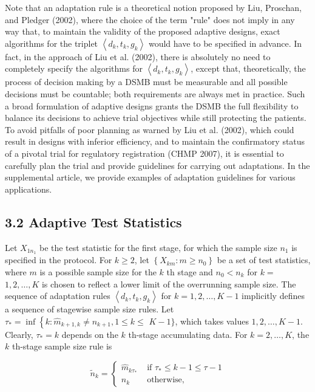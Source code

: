 \documentclass[10pt]{article}
\begin{document}
Note that an adaptation rule is a theoretical notion proposed by Liu, Proschan, and Pledger (2002), where the choice of the term "rule" does not imply in any way that, to maintain the validity of the proposed adaptive designs, exact algorithms for the triplet $\left\langle d_{k}, t_{k}, g_{k}\right\rangle$ would have to be specified in advance. In fact, in the approach of Liu et al. (2002), there is absolutely no need to completely specify the algorithms for $\left\langle d_{k}, t_{k}, g_{k}\right\rangle$, except that, theoretically, the process of decision making by a DSMB must be measurable and all possible decisions must be countable; both requirements are always met in practice. Such a broad formulation of adaptive designs grants the DSMB the full flexibility to balance its decisions to achieve trial objectives while still protecting the patients. To avoid pitfalls of poor planning as warned by Liu et al. (2002), which could result in designs with inferior efficiency, and to maintain the confirmatory status of a pivotal trial for regulatory registration (CHMP 2007), it is essential to carefully plan the trial and provide guidelines for carrying out adaptations. In the supplemental article, we provide examples of adaptation guidelines for various applications.

\subsection*{3.2 Adaptive Test Statistics}
Let $X_{1 n_{1}}$ be the test statistic for the first stage, for which the sample size $n_{1}$ is specified in the protocol. For $k \geq 2$, let $\left\{X_{k m}: m \geq n_{0}\right\}$ be a set of test statistics, where $m$ is a possible sample size for the $k$ th stage and $n_{0}<n_{k}$ for $k=$ $1,2, \ldots, K$ is chosen to reflect a lower limit of the overrunning sample size. The sequence of adaptation rules $\left\langle d_{k}, t_{k}, g_{k}\right\rangle$ for $k=1,2, \ldots, K-1$ implicitly defines a sequence of stagewise sample size rules. Let $\tau_{*}=\inf \left\{k: \hat{m}_{k+1, k} \neq n_{k+1}, 1 \leq k \leq\right.$ $K-1\}$, which takes values $1,2, \ldots, K-1$. Clearly, $\tau_{*}=k$ depends on the $k$ th-stage accumulating data. For $k=2, \ldots, K$, the $k$ th-stage sample size rule is

\[
\tilde{n}_{k}= \begin{cases}\hat{m}_{k \tau_{*}} & \text { if } \tau_{*} \leq k-1 \leq \tau-1  \tag{10}\\ n_{k} & \text { otherwise, }\end{cases}
\]
\end{document}
